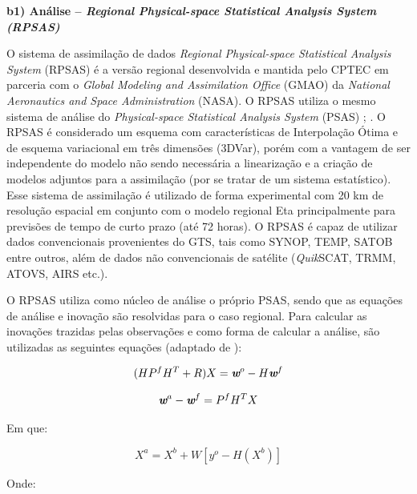\textbf{b1) Análise – \textit{Regional Physical-space Statistical Analysis System (RPSAS)}}

O sistema de assimilação de dados \textit{Regional Physical-space Statistical Analysis System} (RPSAS) é a versão regional desenvolvida e mantida pelo CPTEC em parceria com o \textit{Global Modeling and Assimilation Office} (GMAO) da \textit{National Aeronautics and Space Administration} (NASA). O RPSAS utiliza o mesmo sistema de análise do \textit{Physical-space Statistical Analysis System} (PSAS) \cite{dasilvaetal95}; \cite{cohnetal98}. O RPSAS é considerado um esquema com características de Interpolação Ótima e de esquema variacional em três dimensões (3DVar), porém com a vantagem de ser independente do modelo não sendo necessária a linearização e a criação de modelos adjuntos para a assimilação (por se tratar de um sistema estatístico). Esse sistema de assimilação é utilizado de forma experimental com 20 km de resolução espacial em conjunto com o modelo regional Eta principalmente para previsões de tempo de curto prazo (até 72 horas). O RPSAS é capaz de utilizar dados convencionais provenientes do GTS, tais como SYNOP, TEMP, SATOB entre outros, além de dados não convencionais de satélite (\textit{Quik}SCAT, TRMM, ATOVS, AIRS etc.).

O RPSAS utiliza como núcleo de análise o próprio PSAS, sendo que as equações de análise e inovação são resolvidas para o caso regional. Para calcular as inovações trazidas pelas observações e como forma de calcular a análise, são utilizadas as seguintes equações (adaptado de ):

\begin{equation}
(HP^{f}H^{T}+R)X=\textit{\textbf{w}}^o-H\textit{\textbf{w}}^f
\label{form01}
\end{equation}

\begin{equation}
\textit{\textbf{w}}^a-\textit{\textbf{w}}^f=P^{f}H^{T}X
\label{form02}
\end{equation}

Em que:

\begin{equation}
X^{a}=X^{b}+W[y^{o}-H(X^{b})]
\label{form03}
\end{equation}

Onde:

